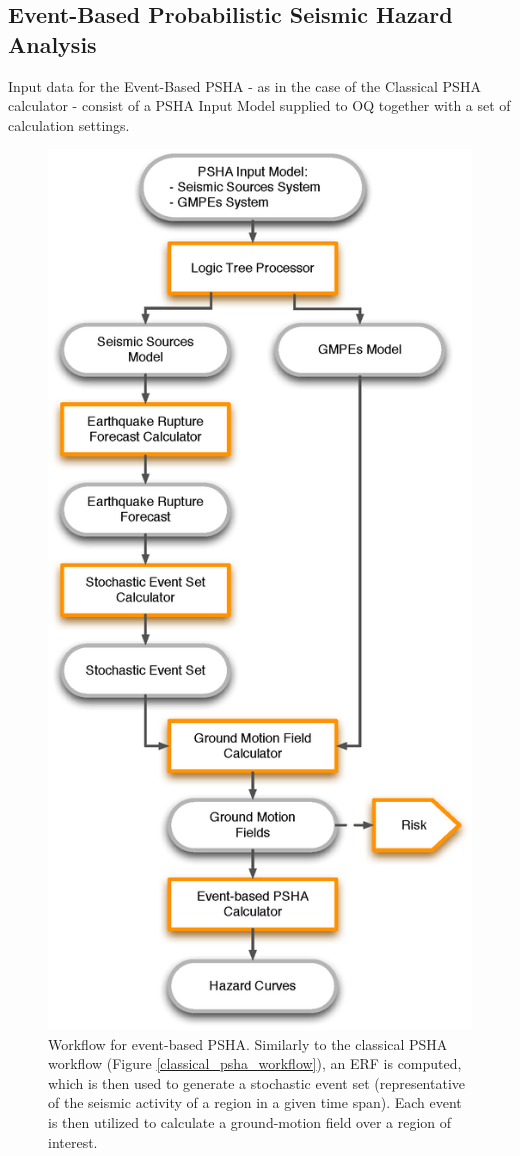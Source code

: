 \subsection{Event-Based Probabilistic Seismic Hazard Analysis}
\label{section:event-basedPSHA}
Input data for the Event-Based PSHA - as in the case of the Classical PSHA 
calculator - consist of a PSHA Input Model supplied to OQ together with a 
set of calculation settings.
%
\begin{figure}
\centering
\includegraphics[width=12cm]{./Figures/Part_Hazard/event_based_workflow.eps}
\caption{Workflow for event-based PSHA. Similarly to the classical PSHA workflow 
(Figure \ref{classical_psha_workflow}), an ERF is computed, which is then used 
to generate a stochastic event set (representative of the seismic activity of 
a region in a given time span). Each event is then utilized to calculate a 
ground-motion field over a region of interest.}
\label{event_based_workflow}
\end{figure}
